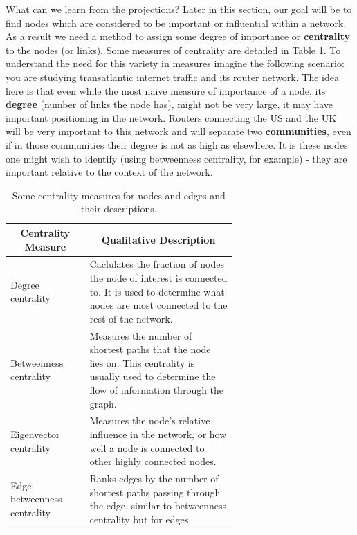 \documentclass[twoside]{report}
\begin{document}
\begin{spacing}{1}
What can we learn from the projections? Later in this section, our goal will be to find nodes which are considered to be important or influential within a network. As a result we need a method to assign some degree of importance or \textbf{centrality} to the nodes (or links). Some measures of centrality are detailed in Table \ref{table:centralityMeasures}. To understand the need for this variety in measures imagine the following scenario: you are studying transatlantic internet traffic and its router network. The idea here is that even while the most naive measure of importance of a node, its \textbf{degree} (number of links the node has), might not be very large, it may have important positioning in the network. Routers connecting the US and the UK will be very important to this network and will separate two \textbf{communities}, even if in those communities their degree is not as high as elsewhere. It is these nodes one might wish to identify (using betweenness centrality, for example) - they are important relative to the context of the network.


\begin{table}[h]
\small
\centering
\begin{tabular}{|l|p{0.65\linewidth}|}
\hline
\multicolumn{1}{|c|}{\textbf{Centrality Measure}} & \multicolumn{1}{c|}{\textbf{Qualitative Description}}
\tabularnewline \hline
      Degree centrality & Caclulates the fraction of nodes the node of interest is connected to. It is used to determine what nodes are most connected to the rest of the network. \\
      \hline
      Betweenness  centrality & Measures the number of shortest paths that the node lies on. This centrality is usually used to determine the flow of information through the graph.\\
      \hline 
      Eigenvector centrality & Measures the node’s relative influence in the network, or how well a node is connected to other highly connected nodes. \\
      \hline 
      Edge betweenness centrality & Ranks edges by the number of shortest paths passing through the edge, similar to betweenness centrality but for edges.
 \tabularnewline \hline
\end{tabular}
\caption{Some centrality measures for nodes and edges and their descriptions.}
\label{table:centralityMeasures}   
\vspace{-4mm}
\end{table}


\end{spacing}
\end{document}
